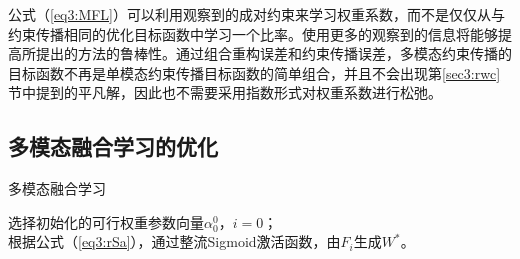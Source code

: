 公式（\ref{eq3:MFL}）可以利用观察到的成对约束来学习权重系数，而不是仅仅从与约束传播相同的优化目标函数中学习一个比率。使用更多的观察到的信息将能够提高所提出的方法的鲁棒性。通过组合重构误差和约束传播误差，多模态约束传播的目标函数不再是单模态约束传播目标函数的简单组合，并且不会出现第\ref{sec3:rwc}节中提到的平凡解，因此也不需要采用指数形式对权重系数进行松弛。

\subsection{多模态融合学习的优化}
\label{sec3:opt}

\begin{algorithm}[t]
	\caption{多模态融合学习}
	\label{alg3:MFL}
    选择初始化的可行权重参数向量$ {\alpha}^0_0 $，$ i = 0 $；\\
    根据公式（\ref{eq3:rSa}），通过整流Sigmoid激活函数，由$F_i$生成$W^*$。
\end{algorithm}

